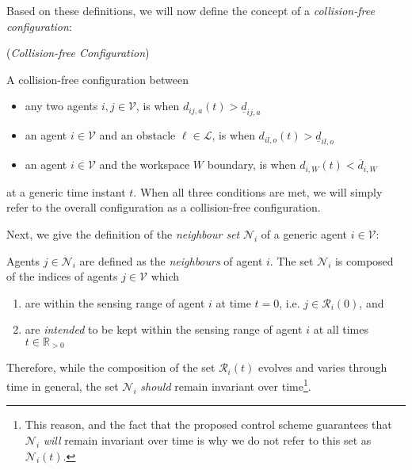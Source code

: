 Based on these definitions, we will now define the concept of a
\textit{collision-free configuration}:
\begin{bw_box}
\begin{definition} (\textit{Collision-free Configuration})

  A collision-free configuration between
  \begin{itemize}
    \item any two agents $i,j \in \mathcal{V}$, is when $d_{ij,a}(t) > \underline{d}_{ij,a}$
    \item an agent $i \in \mathcal{V}$ and an obstacle $\ell \in \mathcal{L}$,
     is when $d_{il,o}(t) > \underline{d}_{il,o}$
    \item an agent $i \in \mathcal{V}$ and the workspace $W$ boundary,
     is when $d_{i,W}(t) < \overline{d}_{i,W}$
  \end{itemize}
  at a generic time instant $t$. When all three conditions are met, we will
  simply refer to the overall configuration as a collision-free configuration.

\end{definition}
\end{bw_box}

Next, we give the definition of the \textit{neighbour set} $\mathcal{N}_i$ of
a generic agent $i \in \mathcal{V}$:

\begin{bw_box}
\begin{definition}
Agents $j \in \mathcal{N}_i$ are defined as the \textit{neighbours} of
agent $i$. The set $\mathcal{N}_i$ is composed of the indices of agents
$j \in \mathcal{V}$ which
\begin{enumerate}
  \item are within the sensing range of agent $i$ at time $t=0$, i.e.
    $j \in \mathcal{R}_i(0)$, and
  \item are \textit{intended} to be kept within the sensing range of agent $i$ at all
    times $t \in \mathbb{R}_{> 0}$
\end{enumerate}
\end{definition}
\end{bw_box}

Therefore, while the composition of the set $\mathcal{R}_i(t)$ evolves and
varies through time in general, the set $\mathcal{N}_i$ \textit{should} remain
invariant over time\footnote{This reason, and the fact that the proposed
control scheme guarantees that $\mathcal{N}_i$ \textit{will} remain invariant
over time is why we do not refer to this set as $\mathcal{N}_i(t)$.}.


